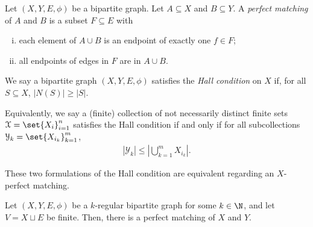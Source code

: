 \documentclass[10pt]{mypackage2}
\begin{document}
\begin{definition}
  Let $\left(X,Y,E,\phi\right)$ be a bipartite graph. Let $A\subseteq X$ and $B\subseteq Y$. A \textit{perfect matching} of $A$ and $B$ is a subset $F\subseteq E$ with
  \begin{enumerate}[(i)]
    \item each element of $A\cup B$ is an endpoint of exactly one $f\in F$;
    \item all endpoints of edges in $F$ are in $A\cup B$.
  \end{enumerate}
\end{definition}
\begin{definition}
  We say a bipartite graph $\left(X,Y,E,\phi\right)$ satisfies the \textit{Hall condition} on $X$ if, for all $S\subseteq X$, $\left\vert N(S) \right\vert \geq \left\vert S \right\vert$.\newline

  Equivalently, we say a (finite) collection of not necessarily distinct finite sets $\mathcal{X} = \set{X_i}_{i=1}^{n}$ satisfies the Hall condition if and only if for all subcollections $\mathcal{Y}_k = \set{X_{i_k}}_{k=1}^{m}$,
  \begin{align*}
    \left\vert \mathcal{Y}_k \right\vert \leq \left\vert \bigcup_{k=1}^{m}X_{i_k} \right\vert.
  \end{align*}
\end{definition}
\begin{remark}
These two formulations of the Hall condition are equivalent regarding an $X$-perfect matching.
\end{remark}
\begin{theorem}
  Let $\left(X,Y,E,\phi\right)$ be a $k$-regular bipartite graph for some $k\in \N$, and let $V = X\sqcup E$ be finite. Then, there is a perfect matching of $X$ and $Y$.\label{thm:hall_finite}
\end{theorem}
\end{document}
